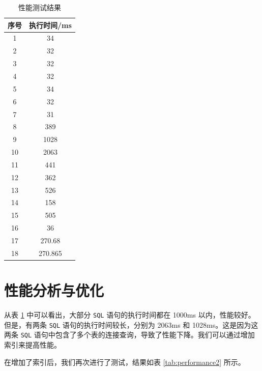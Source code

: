 \documentclass[UTF8,openany]{ctexbook}
\begin{document}
\begin{table}[H]
  \caption{性能测试结果}
  \centering
\label{tab:performance}
\begin{tabular}{cc}
\toprule
\textbf{序号} &  \textbf{执行时间/ms} \\ 
\midrule
1	&34 \\
2	&32 \\
3	&32 \\
4	&32 \\
5	&34 \\
6	&32 \\
7	&31 \\
8	&389 \\
9	&1028 \\
10&	2063 \\
11&	441 \\
12&	362 \\
13&	526 \\
14&	158 \\
15&	505 \\
16&	36 \\
17&	270.68 \\
18&	270.865 \\
\bottomrule
\end{tabular}
\end{table}

\section{性能分析与优化}

从表 \ref{tab:performance} 中可以看出，大部分 \texttt{SQL} 语句的执行时间都在 1000ms 以内，性能较好。但是，有两条 \texttt{SQL} 语句的执行时间较长，分别为 2063ms 和 1028ms。这是因为这两条 \texttt{SQL} 语句中包含了多个表的连接查询，导致了性能下降。我们可以通过增加索引来提高性能。

在增加了索引后，我们再次进行了测试，结果如表 \ref{tab:performance2} 所示。
\end{document}
